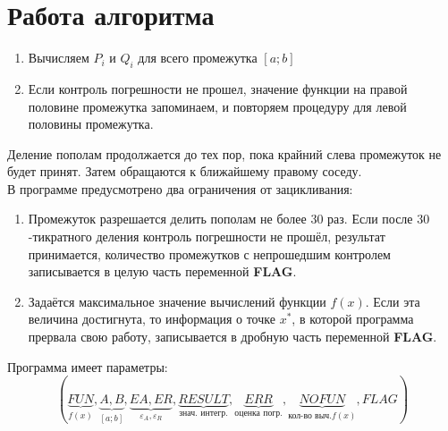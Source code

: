 \documentclass[a4paper,11pt]{article}
\begin{document}
\section{Работа алгоритма}
\begin{enumerate}
  \item Вычисляем $P_i$ и $Q_i$ для всего промежутка $[a; b]$
  \item Если контроль погрешности не прошел, значение функции на правой половине промежутка запоминаем, и повторяем процедуру для левой половины промежутка.
\end{enumerate}
Деление пополам продолжается до тех пор, пока крайний слева промежуток не будет принят. Затем обращаются к ближайшему правому соседу. \\
В программе предусмотрено два ограничения от зацикливания:
\begin{enumerate}
  \item Промежуток разрешается делить пополам не более $30$ раз. Если после $30$-тикратного деления контроль погрешности не прошёл, результат принимается,
        количество промежутков с непрошедшим контролем записывается в целую часть переменной \textbf{FLAG}.
  \item Задаётся максимальное значение вычислений функции $f(x)$. Если эта величина достигнута, то информация о точке $x^*$, в которой программа прервала
        свою работу, записывается в дробную часть переменной \textbf{FLAG}.
\end{enumerate}
Программа имеет параметры:
\begin{equation*}
  (\underbrace{FUN}_{f(x)}, \underbrace{A, B}_{[a; b]}, \underbrace{EA, ER}_{\varepsilon_A, \varepsilon_R}, \underbrace{RESULT}_{\text{знач. интегр.}},
    \underbrace{ERR}_{\text{оценка погр.}}, \underbrace{NOFUN}_{\text{кол-во выч.} f(x)}, FLAG)
\end{equation*}
\end{document}
